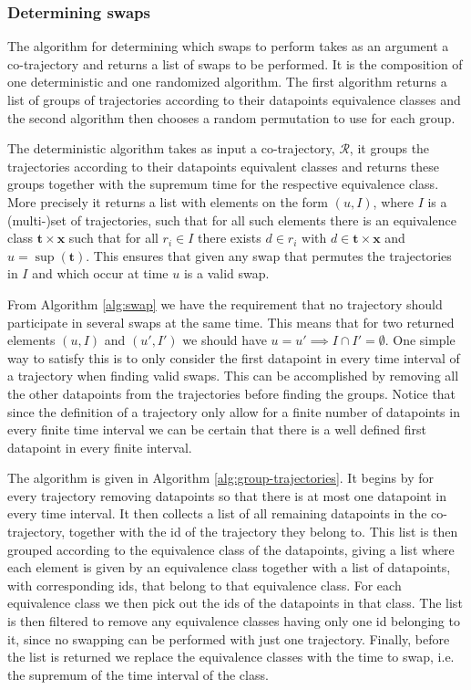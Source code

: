 \documentclass[12pt]{article}
\newcommand{\data}{d}
\newcommand{\traj}{r}
\newcommand{\cotraj}{\mathcal{R}}
\newcommand{\swaptime}{u}
\newcommand{\locint}{\mathbf{x}}
\newcommand{\timint}{\mathbf{t}}
\theoremstyle{definition}
\begin{document}
\subsubsection{Determining swaps}
\label{sec:determining-swaps}

The algorithm for determining which swaps to perform takes as an
argument a co-trajectory and returns a list of swaps to be performed.
It is the composition of one deterministic and one randomized
algorithm. The first algorithm returns a list of groups of
trajectories according to their datapoints equivalence classes and
the second algorithm then chooses a random permutation to use for each
group.

The deterministic algorithm takes as input a co-trajectory,
\(\cotraj\), it groups the trajectories according to their
datapoints equivalent classes and returns these groups together with
the supremum time for the respective equivalence class. More precisely
it returns a list with elements on the form \((\swaptime, I)\), where
\(I\) is a (multi-)set of trajectories, such that for all such
elements there is an equivalence class \(\timint \times \locint\) such
that for all \(\traj_{i} \in I\) there exists \(\data \in \traj_{i}\)
with \(\data \in \timint \times \locint\) and
\(\swaptime = \sup(\timint)\). This ensures that given any swap that
permutes the trajectories in \(I\) and which occur at time
\(\swaptime\) is a valid swap.

From Algorithm \ref{alg:swap} we have the requirement that no
trajectory should participate in several swaps at the same time. This
means that for two returned elements \((\swaptime, I)\) and
\((\swaptime', I')\) we should have
\(\swaptime = \swaptime' \implies I \cap I' = \emptyset\). One simple
way to satisfy this is to only consider the first datapoint in every
time interval of a trajectory when finding valid swaps. This can be
accomplished by removing all the other datapoints from the
trajectories before finding the groups. Notice that since the
definition of a trajectory only allow for a finite number of
datapoints in every finite time interval we can be certain that
there is a well defined first datapoint in every finite interval.

The algorithm is given in Algorithm \ref{alg:group-trajectories}. It
begins by for every trajectory removing datapoints so that there is
at most one datapoint in every time interval. It then collects a
list of all remaining datapoints in the co-trajectory, together with
the id of the trajectory they belong to. This list is then grouped
according to the equivalence class of the datapoints, giving a list
where each element is given by an equivalence class together with a
list of datapoints, with corresponding ids, that belong to that
equivalence class. For each equivalence class we then pick out the ids
of the datapoints in that class. The list is then filtered to remove
any equivalence classes having only one id belonging to it, since no
swapping can be performed with just one trajectory. Finally, before
the list is returned we replace the equivalence classes with the time
to swap, i.e. the supremum of the time interval of the class.
\end{document}
